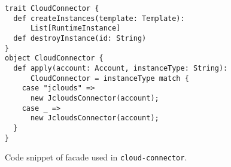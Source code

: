 \begin{figure}[tb]
  \begin{center}
    \begin{verbatim}
trait CloudConnector {
  def createInstances(template: Template): 
      List[RuntimeInstance]
  def destroyInstance(id: String)
}
object CloudConnector {
  def apply(account: Account, instanceType: String): 
      CloudConnector = instanceType match {
    case "jclouds" =>
      new JcloudsConnector(account);
    case _ =>
      new JcloudsConnector(account);
  }
}
    \end{verbatim}
  \end{center}
  \caption{Code snippet of facade used in \texttt{cloud-connector}.}
  \label{list:connector-facade}
\end{figure}

